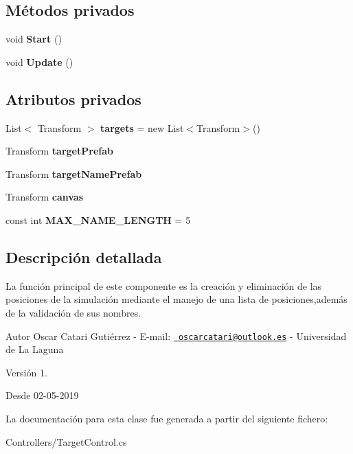 \subsection*{Métodos privados}
\begin{DoxyCompactItemize}
\item 
\mbox{\label{class_target_control_a09f09132c80cd12fd5c906e0f850eb54}} 
void {\bfseries Start} ()
\item 
\mbox{\label{class_target_control_a898896e74adab3b8f8f33fefd7a5fb95}} 
void {\bfseries Update} ()
\end{DoxyCompactItemize}
\subsection*{Atributos privados}
\begin{DoxyCompactItemize}
\item 
\mbox{\label{class_target_control_a20cca6a9d26773a2d4c88ce7a4444987}} 
List$<$ Transform $>$ {\bfseries targets} = new List$<$Transform$>$()
\item 
\mbox{\label{class_target_control_af4ca7f8b6c427b5998fb5d8d1c7d6fc2}} 
Transform {\bfseries target\+Prefab}
\item 
\mbox{\label{class_target_control_a32f92471c5e814892a1b4dabe8646428}} 
Transform {\bfseries target\+Name\+Prefab}
\item 
\mbox{\label{class_target_control_a0320767601ec3c1d87a5a4e72bc41bb1}} 
Transform {\bfseries canvas}
\item 
\mbox{\label{class_target_control_a9abf081f2fa828d749d84e0f158c9480}} 
const int {\bfseries M\+A\+X\+\_\+\+N\+A\+M\+E\+\_\+\+L\+E\+N\+G\+TH} = 5
\end{DoxyCompactItemize}


\subsection{Descripción detallada}
La función principal de este componente es la creación y eliminación de las posiciones de la simulación mediante el manejo de una lista de posiciones,además de la validación de sus nombres. \begin{DoxyAuthor}{Autor}
Oscar Catari Gutiérrez -\/ E-\/mail\+: \href{mailto:oscarcatari@outlook.es}{\texttt{ oscarcatari@outlook.\+es}} -\/ Universidad de La Laguna 
\end{DoxyAuthor}
\begin{DoxyVersion}{Versión}
1. 
\end{DoxyVersion}
\begin{DoxySince}{Desde}
02-\/05-\/2019 
\end{DoxySince}


La documentación para esta clase fue generada a partir del siguiente fichero\+:\begin{DoxyCompactItemize}
\item 
Controllers/Target\+Control.\+cs\end{DoxyCompactItemize}
